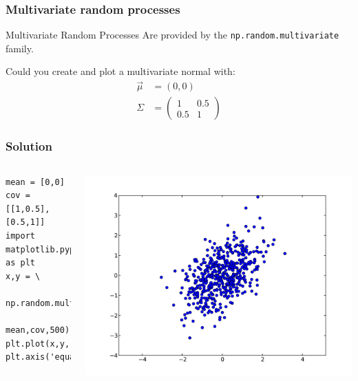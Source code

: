 \documentclass[10pt,colorlinks]{beamer}
\begin{document}
\begin{frame}[fragile]\frametitle{Multivariate random processes}
\begin{block}{Multivariate Random Processes}
Are provided by the \verb|np.random.multivariate| family.
\end{block}
\begin{block}{}
Could you create and plot a multivariate normal with:
\begin{align}
       \vec \mu & = (0, 0) \\
        \Sigma & = \left( \begin{array}{ccc}
            1 & 0.5 \\
            0.5 & 1
        \end{array} \right)
\end{align}
\end{block}

\end{frame}
\begin{frame}[fragile]\frametitle{Solution}
\begin{columns}[c]
\small 
\begin{verbatim}
mean = [0,0]
cov = [[1,0.5],[0.5,1]]
import matplotlib.pyplot as plt
x,y = \
    np.random.multivariate_normal(\
        mean,cov,500).T
plt.plot(x,y,'bo') 
plt.axis('equal')
\end{verbatim}

\includegraphics[width=\textwidth]{plwfigis/CursP_3_figure9}

\end{columns}
\end{frame}
\end{document}
